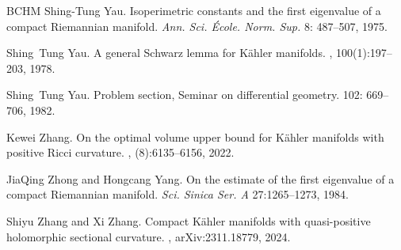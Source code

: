 \documentclass[12pt, reqno]{amsart}
\theoremstyle{plain}
\theoremstyle{definition}
\renewcommand{\>}{\rightarrow}
\renewcommand{\#}{\sharp}
\numberwithin{equation}{section} %
\begin{document}
\begin{thebibliography}{BCHM}
Shing-Tung Yau.  Isoperimetric constants and the first eigenvalue of a compact Riemannian manifold.  \emph{Ann. Sci. École. Norm. Sup.} 8: 487--507, 1975.

Shing~Tung Yau.
\newblock A general {S}chwarz lemma for {K}\"ahler manifolds.
, 100(1):197--203, 1978.

Shing~Tung Yau.
\newblock Problem section, Seminar on differential geometry. 
 102: 669--706, 1982.


Kewei Zhang.
\newblock On the optimal volume upper bound for {K}\"ahler manifolds with positive {R}icci curvature.
, (8):6135--6156, 2022.


JiaQing Zhong and Hongcang Yang.
On the estimate of the first eigenvalue of a compact Riemannian manifold.
\emph{Sci. Sinica Ser. A} 27:1265–1273, 1984.

Shiyu Zhang and Xi Zhang.
\newblock  Compact {K}\"ahler manifolds with quasi-positive holomorphic sectional curvature.
, arXiv:2311.18779, 2024.


\end{thebibliography}



\end{document}
